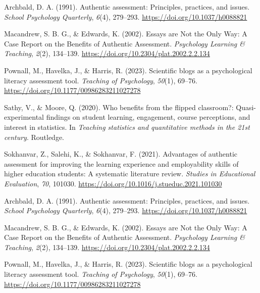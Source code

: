 \documentclass[
  11pt,
  letterpaper,
  oneside,
  open=any]{scrbook}
\newlength{\cslhangindent}
\newlength{\cslentryspacingunit} %
\newenvironment{CSLReferences}[2] %
 {%
  \setlength{\parindent}{0pt}
  \ifodd #1
  \let\oldpar\par
  \def\par{\hangindent=\cslhangindent\oldpar}
  \fi
  \setlength{\parskip}{#2\cslentryspacingunit}
 }%
 {}
\begin{document}
\hypertarget{refs}{}
\begin{CSLReferences}{1}{0}
\leavevmode{}%
Archbald, D. A. (1991). Authentic assessment: Principles, practices, and
issues. \emph{School Psychology Quarterly}, \emph{6}(4), 279--293.
\url{https://doi.org/10.1037/h0088821}

\leavevmode{}%
Macandrew, S. B. G., \& Edwards, K. (2002). Essays are Not the Only Way:
A Case Report on the Benefits of Authentic Assessment. \emph{Psychology
Learning \& Teaching}, \emph{2}(2), 134--139.
\url{https://doi.org/10.2304/plat.2002.2.2.134}

\leavevmode{}%
Pownall, M., Havelka, J., \& Harris, R. (2023). Scientific blogs as a
psychological literacy assessment tool. \emph{Teaching of Psychology},
\emph{50}(1), 69--76. \url{https://doi.org/10.1177/00986283211027278}

\leavevmode{}%
Sathy, V., \& Moore, Q. (2020). Who benefits from the flipped
classroom?: Quasi-experimental findings on student learning, engagement,
course perceptions, and interest in statistics. In \emph{Teaching
statistics and quantitative methods in the 21st century}. Routledge.

\leavevmode{}%
Sokhanvar, Z., Salehi, K., \& Sokhanvar, F. (2021). Advantages of
authentic assessment for improving the learning experience and
employability skills of higher education students: A systematic
literature review. \emph{Studies in Educational Evaluation}, \emph{70},
101030. \url{https://doi.org/10.1016/j.stueduc.2021.101030}

\leavevmode{}%
Archbald, D. A. (1991). Authentic assessment: Principles, practices, and
issues. \emph{School Psychology Quarterly}, \emph{6}(4), 279--293.
\url{https://doi.org/10.1037/h0088821}

\leavevmode{}%
Macandrew, S. B. G., \& Edwards, K. (2002). Essays are Not the Only Way:
A Case Report on the Benefits of Authentic Assessment. \emph{Psychology
Learning \& Teaching}, \emph{2}(2), 134--139.
\url{https://doi.org/10.2304/plat.2002.2.2.134}

\leavevmode{}%
Pownall, M., Havelka, J., \& Harris, R. (2023). Scientific blogs as a
psychological literacy assessment tool. \emph{Teaching of Psychology},
\emph{50}(1), 69--76. \url{https://doi.org/10.1177/00986283211027278}


\end{CSLReferences}
\end{document}

